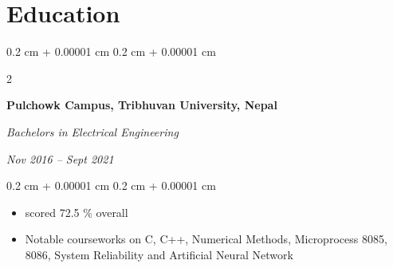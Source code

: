 \documentclass[10pt, letterpaper]{article}
\newenvironment{highlights}{
    \begin{itemize}[
        topsep=0.10 cm,
        parsep=0.10 cm,
        partopsep=0pt,
        itemsep=0pt,
        leftmargin=0.4 cm + 10pt
    ]
}{
    \end{itemize}
} %
\newenvironment{onecolentry}{
    \begin{adjustwidth}{
        0.2 cm + 0.00001 cm
    }{
        0.2 cm + 0.00001 cm
    }
}{
    \end{adjustwidth}
} %
\newenvironment{twocolentry}[2][]{
    \onecolentry
    \def\secondColumn{#2}
    \setcolumnwidth{\fill, 4.5 cm}
    \begin{paracol}{2}
}{
    \switchcolumn \raggedleft \secondColumn
    \end{paracol}
    \endonecolentry
} %
\begin{document}
    \section{Education}
        \begin{twocolentry}{
            
            
        \textit{Nov 2016 –  Sept 2021}}
            \textbf{Pulchowk Campus, Tribhuvan University, Nepal}

            \textit{Bachelors in Electrical Engineering}
        \end{twocolentry}

        \vspace{0.10 cm}
        \begin{onecolentry}
            \begin{highlights}
                \item scored 72.5 \% overall
                \item Notable courseworks on C, C++, Numerical Methods, Microprocess 8085, 8086, System Reliability and Artificial Neural Network
            \end{highlights}
        \end{onecolentry}
\end{document}
